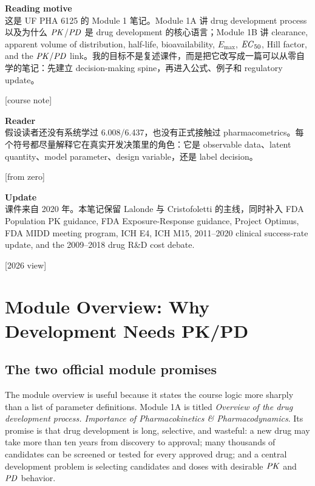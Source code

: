 \documentclass[a4paper]{article}
\renewcommand{\Emax}{\ensuremath{E_{\max}}}
\renewcommand{\ECfifty}{\ensuremath{\pksym{EC}_{50}}}
\newcommand{\PK}{\ensuremath{\pksym{PK}}}
\newcommand{\PD}{\ensuremath{\pksym{PD}}}
\newcommand{\PKPD}{\ensuremath{\pksym{PK}/\pksym{PD}}}
\begin{document}
\maketitle
{\small
  \noindent\textbf{Reading motive}\\
  这是 UF PHA 6125 的 Module 1 笔记。Module 1A 讲 drug development process 以及为什么 \PK{}/\PD{} 是 drug development 的核心语言；Module 1B 讲 clearance, apparent volume of distribution, half-life, bioavailability, \Emax, \ECfifty, Hill factor, and the \PKPD{} link。我的目标不是复述课件，而是把它改写成一篇可以从零自学的笔记：先建立 decision-making spine，再进入公式、例子和 regulatory update。\par\hfill[course note]

  \vspace{5pt}
  \noindent\textbf{Reader}\\
  假设读者还没有系统学过 6.008/6.437，也没有正式接触过 pharmacometrics。每个符号都尽量解释它在真实开发决策里的角色：它是 observable data、latent quantity、model parameter、design variable，还是 label decision。\par\hfill[from zero]

  \vspace{5pt}
  \noindent\textbf{Update}\\
  课件来自 2020 年。本笔记保留 Lalonde 与 Cristofoletti 的主线，同时补入 FDA Population PK guidance, FDA Exposure-Response guidance, Project Optimus, FDA MIDD meeting program, ICH E4, ICH M15, 2011--2020 clinical success-rate update, and the 2009--2018 drug R\&D cost debate.\par\hfill[2026 view]
}

\tableofcontents

\section{Module Overview: Why Development Needs PK/PD}

\subsection{The two official module promises}

The module overview is useful because it states the course logic more sharply than a list of parameter definitions. Module 1A is titled \emph{Overview of the drug development process. Importance of Pharmacokinetics \& Pharmacodynamics}. Its promise is that drug development is long, selective, and wasteful: a new drug may take more than ten years from discovery to approval; many thousands of candidates can be screened or tested for every approved drug; and a central development problem is selecting candidates and doses with desirable \PK{} and \PD{} behavior.
\end{document}

